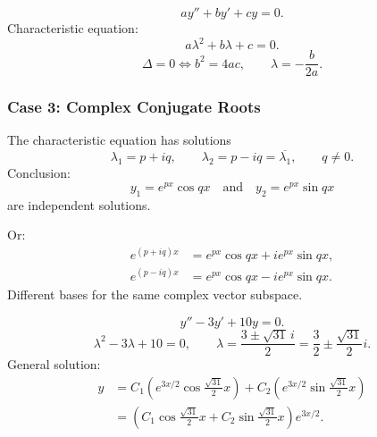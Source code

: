 \begin{thinking}
  \[
    ay''+by'+cy=0.
  \]
  Characteristic equation:
  \[
    a\lambda^2+b\lambda+c=0.
  \]
  \[
    \Delta=0\Longleftrightarrow b^2=4ac,
    \qquad \lambda=-\frac{b}{2a}.
  \]
\end{thinking}

\subsubsection{Case 3: Complex Conjugate Roots}

The characteristic equation has solutions
\[
  \lambda_1=p+iq,\qquad \lambda_2=p-iq=\overline{\lambda_1},\qquad q\ne0.
\]
Conclusion:
\[
  y_1=e^{px}\cos qx\quad\text{and}\quad y_2=e^{px}\sin qx
\]
are independent solutions.

\begin{thinking}
  Or:
  \begin{align*}
    e^{(p+iq)x} & =e^{px}\cos qx+ie^{px}\sin qx, \\
    e^{(p-iq)x} & =e^{px}\cos qx-ie^{px}\sin qx.
  \end{align*}
  Different bases for the same complex vector subspace.
\end{thinking}

\begin{example}
  \[
    y''-3y'+10y=0.
  \]
  \[
    \lambda^2-3\lambda+10=0,
    \qquad \lambda=\frac{3\pm\sqrt{31}\,i}{2}
    =\frac32\pm\frac{\sqrt{31}}2i.
  \]
  General solution:
  \begin{align*}
    y & =C_1\left(e^{3x/2}\cos\frac{\sqrt{31}}2x\right)
    +C_2\left(e^{3x/2}\sin\frac{\sqrt{31}}2x\right)                                \\
      & =\left(C_1\cos\frac{\sqrt{31}}2x+C_2\sin\frac{\sqrt{31}}2x\right)e^{3x/2}.
  \end{align*}
  \begin{center}
  \end{center}
\end{example}

